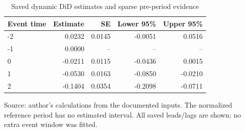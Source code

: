 \begin{table}[htbp]
\centering
\small
\caption{Saved dynamic DiD estimates and sparse pre-period evidence}
\begin{tabularx}{\linewidth}{Xrrrr}
\toprule
Event time & Estimate & SE & Lower 95\% & Upper 95\% \\
\midrule
-2 & 0.0232 & 0.0145 & -0.0051 & 0.0516 \\
-1 & 0.0000 & -- & -- & -- \\
0 & -0.0211 & 0.0115 & -0.0436 & 0.0015 \\
1 & -0.0530 & 0.0163 & -0.0850 & -0.0210 \\
2 & -0.1404 & 0.0354 & -0.2098 & -0.0711 \\
\bottomrule
\end{tabularx}
\par\vspace{3pt}\begin{minipage}{\linewidth}\footnotesize Source: author's calculations from the documented inputs.\allowbreak{} The normalized reference period has no estimated interval.\allowbreak{} All saved leads/lags are shown; no extra event window was fitted.\allowbreak{}\end{minipage}
\end{table}
